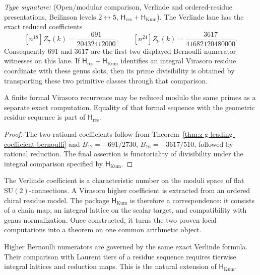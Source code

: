 \begin{theorem}
\label{thm:z-g-s-r-arithmetic-duality}
\ClaimStatusConditional
\emph{Type signature:}
\textup{(Open/modular comparison, Verlinde and ordered-residue
presentations, Beilinson levels \(2\leftrightarrow5\),
\(\mathsf H_{\mathrm{res}}+\mathsf H_{\mathrm{Kum}}\)).}
The Verlinde lane has the exact reduced coefficients
\[
 [n^{18}]Z_7(k)=\frac{691}{20432412000},
 \qquad
 [n^{24}]Z_9(k)=\frac{3617}{41682120480000}.
\]
Consequently \(691\) and \(3617\) are the first two displayed
Bernoulli-numerator witnesses on this lane.  If
\(\mathsf H_{\mathrm{res}}+\mathsf H_{\mathrm{Kum}}\) identifies an
integral Virasoro residue coordinate with these genus slots, then its
prime divisibility is obtained by transporting these two primitive
classes through that comparison.

A finite formal Virasoro recurrence may be reduced modulo the same
primes as a separate exact computation.  Equality of that formal
sequence with the geometric residue sequence is part of
\(\mathsf H_{\mathrm{res}}\).
\end{theorem}

\begin{proof}
The two rational coefficients follow from
Theorem~\ref{thm:z-g-leading-coefficient-bernoulli} and
\(B_{12}=-691/2730\), \(B_{16}=-3617/510\), followed by rational
reduction.  The final assertion is functoriality of divisibility under
the integral comparison specified by \(\mathsf H_{\mathrm{Kum}}\).
\end{proof}

\begin{remark}
\label{rem:localization-disjointness}
The Verlinde coefficient is a characteristic number on the moduli
space of flat \(\mathrm{SU}(2)\)-connections.  A Virasoro higher
coefficient is extracted from an ordered chiral residue model.  The
package \(\mathsf H_{\mathrm{Kum}}\) is therefore a correspondence:
it consists of a chain map, an integral lattice on the scalar target,
and compatibility with genus normalization.  Once constructed, it
turns the two proven local computations into a theorem on one common
arithmetic object.
\end{remark}

\begin{remark}
\label{rem:zg-sr-duality-extensions}
Higher Bernoulli numerators are governed by the same exact Verlinde
formula.  Their comparison with Laurent tiers of a residue sequence
requires tierwise integral lattices and reduction maps.  This is the
natural extension of \(\mathsf H_{\mathrm{Kum}}\).
\end{remark}


